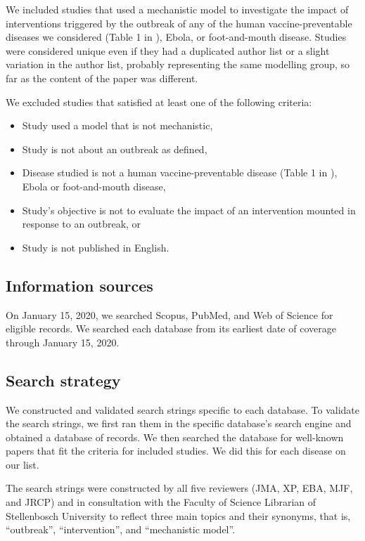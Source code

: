 \documentclass[10pt,letterpaper]{article}
\begin{document}
We included studies that used a mechanistic model to investigate the impact of interventions triggered by the outbreak of any of the human vaccine-preventable diseases we considered (Table 1 in ), Ebola, or foot-and-mouth disease. Studies were considered unique even if they had a duplicated author list or a slight variation in the author list, probably representing the same modelling group, so far as the content of the paper was different. 


We excluded studies that satisfied at least one of the following criteria: 

\begin{itemize}
	\item Study used a model that is not mechanistic,
	\item Study is not about an outbreak as defined,
	\item Disease studied is not a human vaccine-preventable disease (Table 1 in ), Ebola or foot-and-mouth disease,
	\item Study's objective is not to evaluate the impact of an intervention mounted in response to an outbreak, or
	\item Study is not published in English.
\end{itemize}

\subsection*{Information sources}
On January 15, 2020, we searched Scopus, PubMed, and Web of Science for eligible records. We searched each database from its earliest date of coverage through January 15, 2020. 

\subsection*{Search strategy}
We constructed and validated search strings specific to each database. To validate the search strings, we first ran them in the specific database's search engine and obtained a database of records. We then searched the database for well-known papers that fit the criteria for included studies. We did this for each disease on our list. 

The search strings were constructed by all five reviewers (JMA, XP, EBA, MJF, and JRCP) and in consultation with the Faculty of Science Librarian of Stellenbosch University to reflect three main topics and their synonyms, that is, ``outbreak'', ``intervention'', and ``mechanistic model''. 
\end{document}
